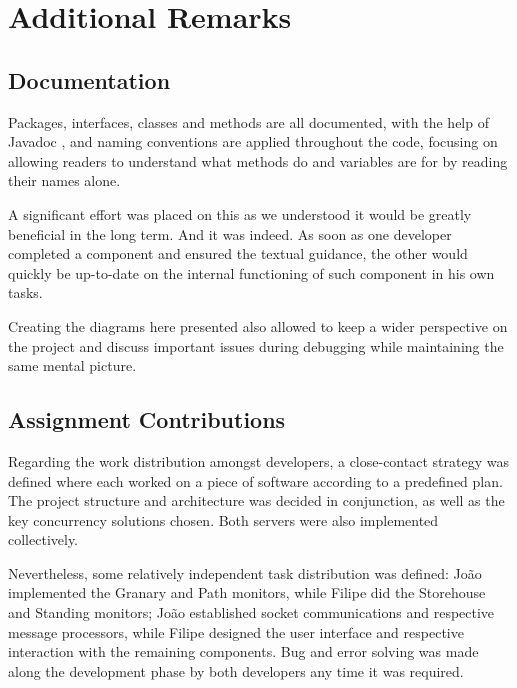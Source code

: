 \documentclass[12pt]{article}
\begin{document}
\newpage
\section{Additional Remarks} %

\subsection{Documentation} %

Packages, interfaces, classes and methods are all documented, with the help of Javadoc \cite{javadoc}, and naming conventions are applied throughout the code, 
focusing on allowing readers to understand what methods do and variables are for by reading their names alone.

A significant effort was placed on this as we understood it would be greatly beneficial in the long term.
And it was indeed. As soon as one developer completed a component and ensured the textual guidance, the other would quickly be up-to-date on the internal 
functioning of such component in his own tasks.

Creating the diagrams here presented also allowed to keep a wider perspective on the project and discuss important issues during debugging while maintaining 
the same mental picture.

\subsection{Assignment Contributions} %

Regarding the work distribution amongst developers, a close-contact strategy was defined where each worked on a piece of software according to a predefined plan. 
The project structure and architecture was decided in conjunction, as well as the key concurrency solutions chosen.
Both servers were also implemented collectively.

Nevertheless, some relatively independent task distribution was defined: João implemented the Granary and Path monitors, while Filipe did the Storehouse and 
Standing monitors; João established socket communications and respective message processors, while Filipe designed the user interface and respective interaction
with the remaining components.
Bug and error solving was made along the development phase by both developers any time it was required.
\end{document}
